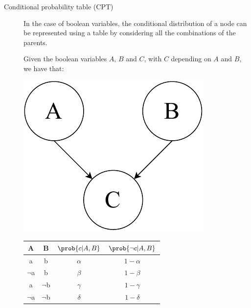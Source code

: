 \begin{description}
        \begin{description}
            \item[Conditional probability table (CPT)] 
                In the case of boolean variables, the conditional distribution of a node can be represented using 
                a table by considering all the combinations of the parents.

                \begin{example} 
                    Given the boolean variables $A$, $B$ and $C$, with $C$ depending on $A$ and $B$, we have that:\\
                    \begin{minipage}{.48\linewidth}
                        \centering
                        \includegraphics[width=0.35\linewidth]{img/_cpt_graph.pdf}
                    \end{minipage}
                    \begin{minipage}{.48\linewidth}
                        \centering
                        \begin{tabular}{c|c|c|c}
                            A           & B         & $\prob{c \vert A, B}$ & $\prob{\lnot c \vert A, B}$ \\
                            \hline
                            a           & b         & $\alpha$ & $1-\alpha$ \\
                            $\lnot$a    & b         & $\beta$ & $1-\beta$ \\
                            a           & $\lnot$b  & $\gamma$ & $1-\gamma$ \\
                            $\lnot$a    & $\lnot$b  & $\delta$ & $1-\delta$ \\
                        \end{tabular}
                    \end{minipage}
                \end{example}
        \end{description}


\end{description}
